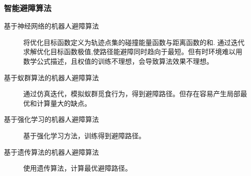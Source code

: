 \documentclass[a4paper]{article}
\begin{document}
	\subsubsection{智能避障算法}
	\begin{description}
		\item[基于神经网络的机器人避障算法] 将优化目标函数定义为轨迹点集的碰撞能量函数与距离函数的和. 通过迭代求解优化目标函数极值,使路径能避障同时趋向于最短。但有时环境难以用数学公式描述，且权值的训练不理想，会导致算法效果不理想。
		\item[基于蚁群算法的机器人避障算法] 通过仿真迭代，模拟蚁群觅食行为，得到避障路径。但存在容易产生局部最优和计算量大的缺点。
		\item[基于强化学习的机器人避障算法] 基于强化学习方法，训练得到避障路径。
		\item[基于遗传算法的机器人避障算法] 使用遗传算法，计算最优避障路径。
	\end{description}
	
\end{document}
